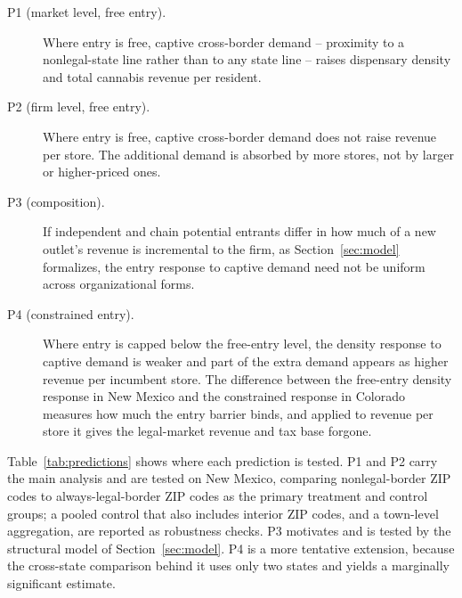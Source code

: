 \documentclass[english,12pt]{article}
\begin{document}
\begin{description}
\item[P1 (market level, free entry).] Where entry is free, captive cross-border demand -- proximity to a nonlegal-state line rather than to any state line -- raises dispensary density and total cannabis revenue per resident.
\item[P2 (firm level, free entry).] Where entry is free, captive cross-border demand does not raise revenue per store. The additional demand is absorbed by more stores, not by larger or higher-priced ones.
\item[P3 (composition).] If independent and chain potential entrants differ in how much of a new outlet's revenue is incremental to the firm, as Section~\ref{sec:model} formalizes, the entry response to captive demand need not be uniform across organizational forms.
\item[P4 (constrained entry).] Where entry is capped below the free-entry level, the density response to captive demand is weaker and part of the extra demand appears as higher revenue per incumbent store. The difference between the free-entry density response in New Mexico and the constrained response in Colorado measures how much the entry barrier binds, and applied to revenue per store it gives the legal-market revenue and tax base forgone.
\end{description}

Table~\ref{tab:predictions} shows where each prediction is tested. P1 and P2 carry the main analysis and are tested on New Mexico, comparing nonlegal-border ZIP codes to always-legal-border ZIP codes as the primary treatment and control groups; a pooled control that also includes interior ZIP codes, and a town-level aggregation, are reported as robustness checks. P3 motivates and is tested by the structural model of Section~\ref{sec:model}. P4 is a more tentative extension, because the cross-state comparison behind it uses only two states and yields a marginally significant estimate.
\end{document}
